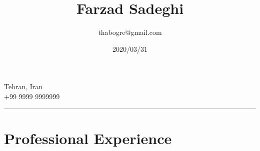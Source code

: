 \documentclass[10pt]{article}
\title{\bfseries\Huge Farzad Sadeghi}
\author{thabogre@gmail.com}
\date{2020/03/31}
\begin{document}
\maketitle
\begin{center}
  \begin{minipage}[ht]{0.2\textwidth}{\centering}
  \vspace*{\fill}
  \centering
  Tehran, Iran\\
  +99 9999 9999999
  \centering
  \vspace*{\fill}
  \end{minipage}
\end{center}

\vspace{5mm}
\hrule
\vspace{5mm}

\section*{Professional Experience}
\end{document}
